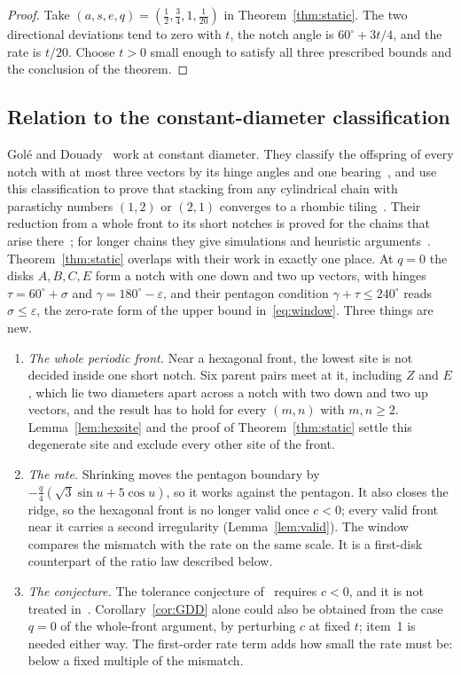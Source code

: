 \documentclass[11pt]{amsart}
\theoremstyle{definition}
\newcommand{\eps}{\varepsilon}
\begin{document}
\begin{proof}
Take $(a,s,e,q)=(\tfrac12,\tfrac34,1,\tfrac1{20})$ in Theorem~\ref{thm:static}.
The two directional deviations tend to zero with $t$, the notch angle is $60^\circ+3t/4$,
and the rate is $t/20$. Choose $t>0$ small enough to satisfy all three prescribed bounds
and the conclusion of the theorem.
\end{proof}

\subsection*{Relation to the constant-diameter classification}
Gol\'e and Douady~\cite{GD} work at constant diameter. They classify the offspring of every notch
with at most three vectors by its hinge angles and one bearing~\cite[Sec.~4]{GD}, and use this
classification to prove that stacking from any cylindrical chain with parastichy numbers $(1,2)$ or
$(2,1)$ converges to a rhombic tiling~\cite[Thm.~1]{GD}. Their reduction from a whole front to its
short notches is proved for the chains that arise there~\cite[Props.~4.4, 4.5]{GD}; for longer
chains they give simulations and heuristic arguments~\cite[Sec.~2.4]{GD}.
Theorem~\ref{thm:static} overlaps with their work in exactly one place. At $q=0$ the disks $A,B,C,E$
form a notch with one down and two up vectors, with hinges $\tau=60^\circ+\sigma$ and
$\gamma=180^\circ-\eps$, and their pentagon condition $\gamma+\tau\le240^\circ$ reads $\sigma\le\eps$,
the zero-rate form of the upper bound in~\eqref{eq:window}. Three things are new.
\begin{enumerate}
\item \emph{The whole periodic front.} Near a hexagonal front, the lowest site is not decided inside
one short notch. Six parent pairs meet at it, including $Z$ and $E$, which lie two diameters apart
across a notch with two down and two up vectors, and the result has to hold for every $(m,n)$ with
$m,n\ge2$. Lemma~\ref{lem:hexsite} and the proof of Theorem~\ref{thm:static} settle this
degenerate site and exclude every other site of the front.
\item \emph{The rate.} Shrinking moves the pentagon boundary by $-\tfrac q4(\sqrt3\sin u+5\cos u)$, so it
works against the pentagon. It also closes the ridge, so the hexagonal front is no longer valid once
$c<0$; every valid front near it carries a second irregularity (Lemma~\ref{lem:valid}). The window
compares the mismatch with the rate on the same scale. It is a first-disk counterpart of the ratio
law described below.
\item \emph{The conjecture.} The tolerance conjecture of~\cite{GDD} requires $c<0$, and it is not
treated in~\cite{GD}. Corollary~\ref{cor:GDD} alone could also be obtained from the case $q=0$ of the
whole-front argument, by perturbing $c$ at fixed $t$; item~1 is needed either way. The first-order rate
term adds how small the rate must be: below a fixed multiple of the mismatch.
\end{enumerate}
\end{document}
